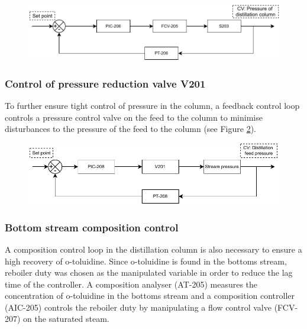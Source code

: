 \begin{figure}[H]
    \centering
    \includegraphics[width=\linewidth]{chapters/4-operation-control/4-Figures/S203-PC.pdf}
    \caption{}
    \label{fig:S203-PC}
\end{figure}


\subsubsection{Control of pressure reduction valve V201}
To further ensure tight control of pressure in the column, a feedback control loop controls a pressure control valve on the feed to the column to minimise disturbances to the pressure of the feed to the column (see Figure \ref{fig:V201-PC}).

\begin{figure}[H]
    \centering
    \includegraphics[width=\linewidth]{chapters/4-operation-control/4-Figures/V201-PC.pdf}
    \caption{}
    \label{fig:V201-PC}
\end{figure}


\subsubsection{Bottom stream composition control}
A composition control loop in the distillation column is also necessary to ensure a high recovery of o-toluidine. Since o-toluidine is found in the bottoms stream, reboiler duty was chosen as the manipulated variable in order to reduce the lag time of the controller. A composition analyser (AT-205) measures the concentration of o-toluidine in the bottoms stream and a composition controller (AIC-205) controls the reboiler duty by manipulating a flow control valve (FCV-207) on the saturated steam. 

